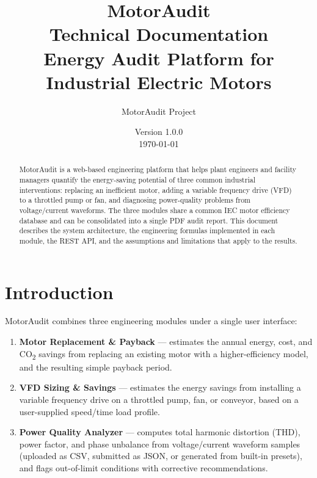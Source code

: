 \documentclass[11pt,a4paper]{article}
\title{\vspace{-2cm}\textbf{MotorAudit}\\[0.3em]
\large Technical Documentation \\[0.2em]
\normalsize Energy Audit Platform for Industrial Electric Motors}
\author{MotorAudit Project}
\date{Version 1.0.0 \\ \today}
\begin{document}
\maketitle
\thispagestyle{empty}

\begin{abstract}
\noindent
MotorAudit is a web-based engineering platform that helps plant engineers and
facility managers quantify the energy-saving potential of three common
industrial interventions: replacing an inefficient motor, adding a variable
frequency drive (VFD) to a throttled pump or fan, and diagnosing power-quality
problems from voltage/current waveforms. The three modules share a common IEC
motor efficiency database and can be consolidated into a single PDF audit
report. This document describes the system architecture, the engineering
formulas implemented in each module, the REST API, and the assumptions and
limitations that apply to the results.
\end{abstract}

\thispagestyle{empty}
\newpage

\tableofcontents
\newpage

\section{Introduction}

MotorAudit combines three engineering modules under a single user interface:

\begin{enumerate}[label=\textbf{\arabic*.}]
    \item \textbf{Motor Replacement \& Payback} --- estimates the annual
          energy, cost, and CO\textsubscript{2} savings from replacing an
          existing motor with a higher-efficiency model, and the resulting
          simple payback period.
    \item \textbf{VFD Sizing \& Savings} --- estimates the energy savings
          from installing a variable frequency drive on a throttled pump,
          fan, or conveyor, based on a user-supplied speed/time load profile.
    \item \textbf{Power Quality Analyzer} --- computes total harmonic
          distortion (THD), power factor, and phase unbalance from
          voltage/current waveform samples (uploaded as CSV, submitted as
          JSON, or generated from built-in presets), and flags out-of-limit
          conditions with corrective recommendations.
\end{enumerate}
\end{document}
